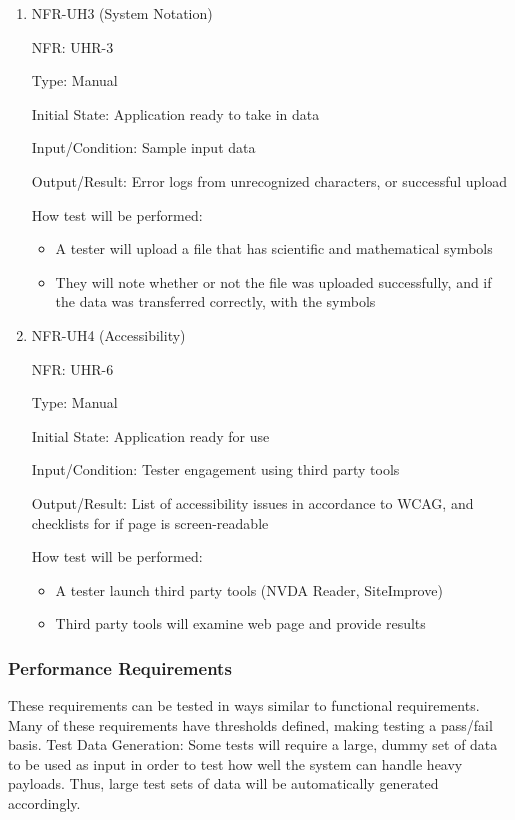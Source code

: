 \documentclass[12pt, titlepage]{article}
\begin{document}
\begin{enumerate}
  \item{NFR-UH3 (System Notation)\\}

  NFR: UHR-3

  Type: Manual

  Initial State: Application ready to take in data

  Input/Condition: Sample input data

  Output/Result: Error logs from unrecognized characters, or successful upload
  
  How test will be performed:
  \begin{itemize}
    \item A tester will upload a file that has scientific and mathematical symbols
    \item They will note whether or not the file was uploaded successfully, and if the data was transferred correctly, with the symbols
  \end{itemize}

  \item{NFR-UH4 (Accessibility)\\}

  NFR: UHR-6
  
  Type: Manual
  
  Initial State: Application ready for use
  
  Input/Condition: Tester engagement using third party tools
  
  Output/Result: List of accessibility issues in accordance to WCAG, and
  checklists for if page is screen-readable
  
  How test will be performed:
  \begin{itemize}
    \item A tester launch third party tools (NVDA Reader, SiteImprove)
    \item Third party tools will examine web page and provide results
    \end{itemize}
  \end{enumerate}

\subsubsection{Performance Requirements}
These requirements can be tested in ways similar to functional requirements.
Many of these requirements have thresholds defined, making testing a pass/fail
basis.
\newline \newline
Test Data Generation: Some tests will require a large, dummy set of data to be
used as input in order to test how well the system can handle heavy payloads.
Thus, large test sets of data will be automatically generated accordingly.
\end{document}
